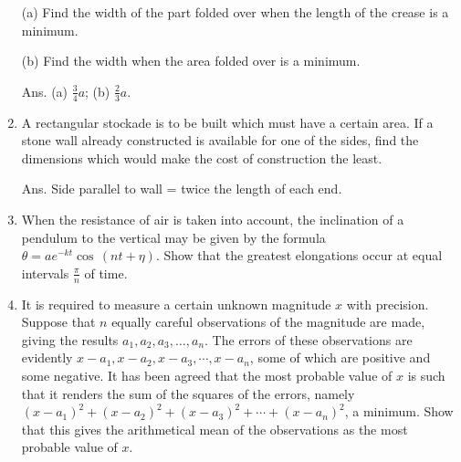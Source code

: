 \begin{enumerate}
(a) Find the width of the part folded over when the length of the 
crease is a minimum. 

(b) Find the width when the area folded over is a minimum.

Ans. (a) $\frac{3}{4}a$; (b) $\frac{2}{3}a$.

\item
A rectangular stockade is to be built which must have a certain 
area. If a stone wall already constructed is available for one of 
the sides, find the dimensions which would make the cost of construction the least.

Ans. Side parallel to wall = twice the length of each end.

%
%

\item
When the resistance of air is taken into account, the inclination 
of a pendulum to the vertical may be given by the formula
$\theta= ae^{-kt}\cos\, (nt + \eta)$.
Show that the greatest elongations occur at equal intervals 
$\frac{\pi}{n}$ of time.

\item
 It is required to measure a certain unknown magnitude $x$ with precision. 
Suppose that $n$ equally careful observations of the magnitude 
are made, giving the results
$ a_1, a_2, a_3, \dots, a_n$.
The errors of these observations are evidently
$ x - a_1, x - a_2, x - a_3, \cdots, x - a_n$,
some of which are positive and some negative.
It has been agreed that the most probable value of $x$ is such that it 
renders the sum of the squares of the errors, namely
$(x - a_1)^2 + (x - a_2)^2 + (x - a_3)^2 + \cdots + (x - a_n)^2$,
a minimum. Show that this gives the arithmetical mean of the 
observations as the most probable value of $x$.


\end{enumerate}
